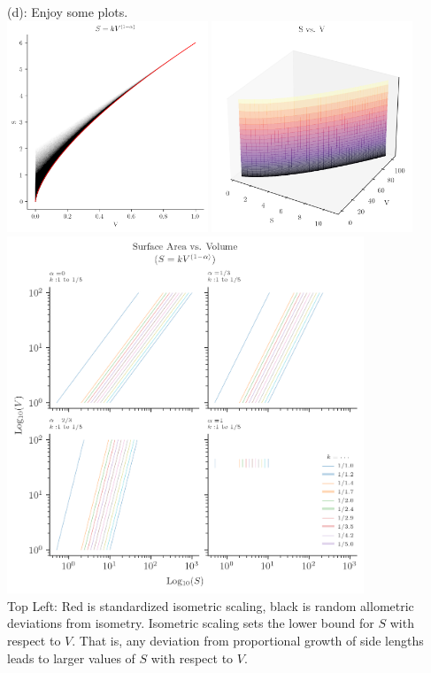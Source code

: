 \begin{enumerate}
(d): Enjoy some plots.\\
\includegraphics[width=0.45\textwidth]{figures/iso_alo.png}
\includegraphics[width=0.45\textwidth]{figures/S_vs_V_3D.png}\\
\includegraphics[width=0.8\textwidth]{figures/S_vs_V.png}\\
Top Left: Red is standardized isometric scaling, black is random allometric deviations from isometry.
Isometric scaling sets the lower bound for $S$ with respect to $V$.
That is, any deviation from proportional growth of side lengths leads to larger values of $S$ with respect to $V$.


\end{enumerate}

